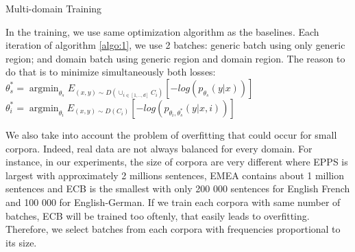 \documentclass[11pt,a4paper]{article}
\DeclareMathOperator*{\argmin}{argmin}
\newcommand{\fyTodo}[1]{\Todo[FY:]{\textcolor{orange}{#1}}}
\begin{document}
\begin{algorithm}[h]
\caption{Multi-domain Training}
\label{algo:1}
\begin{algorithmic}[1]
\REPEAT 
{}
\end{algorithmic}
\end{algorithm}

In the training, we use same optimization algorithm as the baselines.
Each iteration of algorithm \ref{algo:1}, we use 2 batches: generic batch using only generic region; and domain batch using generic region and domain region. The reason to do that is to minimize simultaneously both losses: \\
$\theta^*_{s}=\displaystyle{\mathop{\argmin}_{\theta_s}}E_{(x,y) \sim D(\displaystyle{\mathop{\cup}_{i \in [1,..,d]}}C_{i})}[-log(p_{\theta_s}(y|x))]$ \\ 
$ \theta^*_{i}=\displaystyle{\mathop{\argmin}_{\theta_i}}E_{(x,y) \sim D(C_{i})}[-log(p_{\theta_i,\theta^*_s}(y|x,i))]
$ 

We also take into account the problem of overfitting that could occur for small corpora. Indeed, real data are not always balanced for every domain. For instance, in our experiments, the size of corpora are very different where EPPS is largest with approximately 2 millions sentences, EMEA contains about 1 million sentences and ECB is the smallest with only 200 000 sentences for English French and 100 000 for English-German. If we train each corpora with same number of batches, ECB will be trained too oftenly, that easily leads to overfitting. Therefore, we select batches from each corpora with frequencies proportional to its size. \fyTodo{Refs on this ? or contrast ?}
\end{document}
